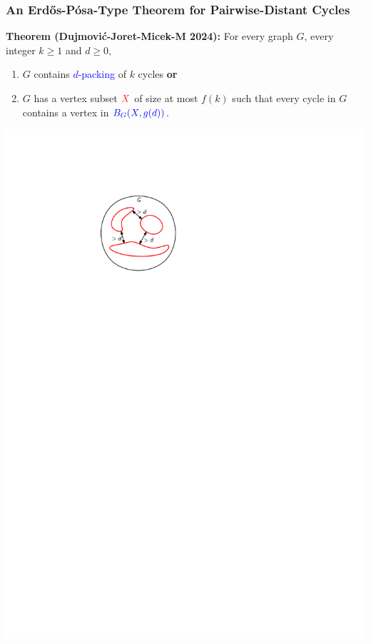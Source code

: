 \documentclass{beamer}
\begin{document}
\begin{frame}
  \frametitle{An Erdős-Pósa-Type Theorem for Pairwise-Distant Cycles}

  \noindent\textbf{Theorem (Dujmović-Joret-Micek-M 2024):} For every graph $G$, every integer $k\ge 1$ and $d\ge 0$,
  \begin{enumerate}%
    \item $G$ contains \textcolor{blue}{$d$-packing} of $k$ cycles \textbf{or}
    \item $G$ has a vertex subset $\mathcolor{red}{X}$ of size at most $f(k)$ such that every cycle in $G$ contains a vertex in $\mathcolor{blue}{B_G(X, g(d))}$.
  \end{enumerate}

  \begin{center}
    \includegraphics[page=1]{figs/cep}

\end{center}
\end{frame}
\end{document}
